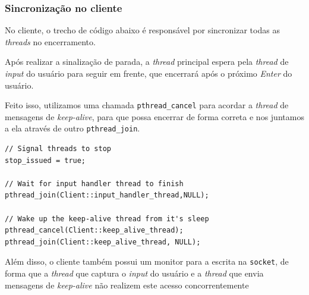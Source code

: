 \documentclass{article}
\begin{document}
\subsubsection{Sincronização no cliente}
\par No cliente, o trecho de código abaixo é responsável por sincronizar todas as \textit{threads} no encerramento. 
\par Após realizar a sinalização de parada, a \textit{thread} principal espera pela \textit{thread} de \textit{input} do usuário para seguir em frente, que encerrará após o próximo \textit{Enter} do usuário.
\par Feito isso, utilizamos uma chamada \texttt{pthread\_cancel} para acordar a \textit{thread} de mensagens de \textit{keep-alive}, para que possa encerrar de forma correta e nos juntamos a ela através de outro \texttt{pthread\_join}.
\\
\begin{lstlisting}
// Signal threads to stop
stop_issued = true;

// Wait for input handler thread to finish
pthread_join(Client::input_handler_thread,NULL);

// Wake up the keep-alive thread from it's sleep
pthread_cancel(Client::keep_alive_thread);
pthread_join(Client::keep_alive_thread, NULL);
\end{lstlisting}
\par Além disso, o cliente também possui um monitor para a escrita na \texttt{socket}, de forma que a \textit{thread} que captura o \textit{input} do usuário e a \textit{thread} que envia mensagens de \textit{keep-alive} não realizem este acesso concorrentemente
\end{document}

